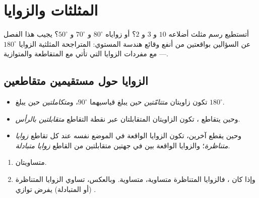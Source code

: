 \chapter{المثلثات والزوايا}\label{ch:g7:triangles}

أتستطيع رسم مثلث أضلاعه $10$ و $3$ و $2$؟ أو زواياه
$80^\circ$ و $70^\circ$ و $50^\circ$؟ يجيب هذا الفصل عن السؤالين
بواقعتين من أنفع وقائع هندسة المستوي: المتراجحة
المثلثية  الزوايا $180^\circ$ --- مع مفردات
الزوايا التي تأتي مع  المتقاطعة والمتوازية.

\section{الزوايا حول مستقيمين متقاطعين}

\begin{definition}\label{def:g7:triangles:pairs}
\begin{itemize}
  \item تكون زاويتان \emph{متتامّتين} حين يبلغ  قياسيهما
        $90^\circ$، و\emph{متكاملتين} حين يبلغ
        $180^\circ$.
  \item وحين يتقاطع ، تكون الزاويتان المتقابلتان عبر
        نقطة التقاطع \emph{متقابلتين
        بالرأس}.
  \item وحين يقطع   آخرين، تكون الزوايا الواقعة في
        الموضع نفسه عند كل تقاطع
        \emph{زوايا متناظرة}؛ والزوايا الواقعة بين  في
        جهتين متقابلتين من  القاطع \emph{زوايا
        متبادلة}.
\end{itemize}
\end{definition}

\begin{theorem}\label{thm:g7:triangles:equalities}
\begin{enumerate}
  \item {} متساويتان.
  \item وإذا كان  ، فالزوايا المتناظرة متساوية،
         متساوية. وبالعكس، تساوي الزوايا المتناظرة
        (أو المتبادلة) يفرض توازي .
\end{enumerate}
\end{theorem}

